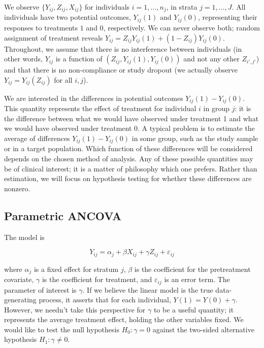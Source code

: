 \documentclass[12pt]{article}
\begin{document}
We observe $\{Y_{ij}, Z_{ij}, X_{ij}\}$ for individuals $i = 1, \dots, n_j$, in strata $j = 1, \dots, J$.
All individuals have two potential outcomes, $Y_{ij}(1)$ and $Y_{ij}(0)$, representing their responses to treatments $1$ and $0$, respectively.
We can never observe both; random assignment of treatment reveals $Y_{ij} = Z_{ij}Y_{ij}(1) + (1-Z_{ij})Y_{ij}(0)$.
Throughout, we assume that there is no interference between individuals 
(in other words, $Y_{ij}$ is a function of $(Z_{ij}, Y_{ij}(1), Y_{ij}(0))$ and not any other $Z_{i', j'}$)
and that there is no non-compliance or study dropout 
(we actually observe $Y_{ij} = Y_{ij}(Z_{ij})$ for all $i, j$).

We are interested in the differences in potential outcomes $Y_{ij}(1) - Y_{ij}(0)$.
This quantity represents the effect of treatment for individual $i$ in group $j$: 
it is the difference between what we would have observed under treatment 1 and what we would have observed under treatment $0$.
A typical problem is to estimate the average of differences $Y_{ij}(1) - Y_{ij}(0)$ in some group, such as the study sample or in a target population.
Which function of these differences will be considered depends on the chosen method of analysis.
Any of these possible quantities may be of clinical interest; it is a matter of philosophy which one prefers.
Rather than estimation, we will focus on hypothesis testing for whether these differences are nonzero.

\subsection{Parametric ANCOVA}

The model is

\begin{equation}\label{eqn:ancova}
Y_{ij} = \alpha_j + \beta X_{ij} + \gamma Z_{ij} + \varepsilon_{ij}
\end{equation}

\noindent where $\alpha_j$ is a fixed effect for stratum $j$, $\beta$ is the coefficient for the pretreatment covariate,
$\gamma$ is the coefficient for treatment,
and $\varepsilon_{ij}$ is an error term.
The parameter of interest is $\gamma$. 
If we believe the linear model is the true data-generating process, it asserts that for each individual, $Y(1) = Y(0) + \gamma$.
However, we needn't take this perspective for $\gamma$ to be a useful quantity; it represents the average treatment effect, holding the other variables fixed.
We would like to test the null hypothesis $H_0: \gamma = 0$ against
the two-sided alternative hypothesis $H_1: \gamma \neq 0$.
\end{document}
